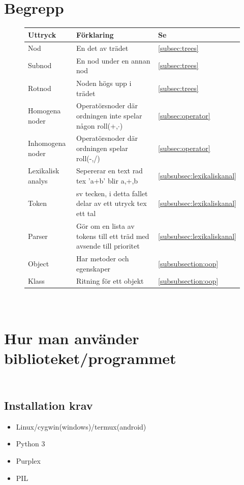 \documentclass[12pt,a4paper]{article}
\begin{document}
\begin{appendices}
\section{\\Begrepp}
\begin{figure}[h!]
  \centering
  \begin{tabular}{l|l|l}
    \textbf{Uttryck} & \textbf{Förklaring} & \textbf{Se} \\
    \hline
    Nod & En det av trädet & \ref{subsec:trees} \\
    Subnod & En nod under en annan nod & \ref{subsec:trees} \\
    Rotnod & Noden högs upp i trädet & \ref{subsec:trees} \\
    Homogena noder & Operatörsnoder där ordningen inte spelar någon roll(+,\(\cdot\)) & \ref{subsec:operator} \\
    Inhomogena noder & Operatörsnoder där ordningen spelar roll(-,/) & \ref{subsec:operator} \\
    Lexikalisk analys & Sepererar en text rad tex 'a+b' blir a,+,b & \ref{subsubsec:lexikaliskanal} \\
    Token & sv tecken, i detta fallet delar av ett utryck tex ett tal & \ref{subsubsec:lexikaliskanal} \\
    Parser & Gör om en lista av tokens till ett träd med avsende till prioritet & \ref{subsubsec:lexikaliskanal} \\
    Object & Har metoder och egenskaper & \ref{subsubsection:oop} \\
    Klass & Ritning för ett objekt & \ref{subsubsection:oop} \\
  \end{tabular}
\end{figure}
\section{\\Hur man använder biblioteket/programmet}
\subsection{\\Installation krav}
\begin{itemize}
  \item Linux/cygwin(windows)/termux(android)
  \item Python 3
  \item Purplex
  \item PIL
\end{itemize}

\end{appendices}
\end{document}
